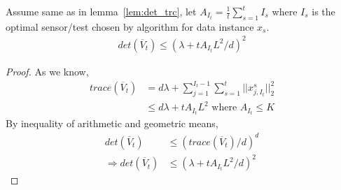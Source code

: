 \begin{lemma}
	\label{lem:tight_det_trc}
	Assume same as in lemma~\ref{lem:det_trc},  let $A_{I_t} = \frac{1}{t}\sum_{s=1}^{t}I_s$ where $I_s$ is the optimal sensor/test chosen by algorithm for data instance $x_s$. 
	\begin{align*}
	det(\overline{V}_t) \le (\lambda + tA_{I_t}L^2/d)^2
	\end{align*}
	
	\begin{proof}
		As we know, 
		\begin{align*}
		trace(\overline{V}_t) &= d\lambda +\sum_{j=1}^{I_t-1}\sum_{s=1}^{t}||x_{j, I_t}^s||_2^2  \\
		&\le d\lambda + tA_{I_t}L^2 \text{ where $A_{I_t} \le K$}
		\end{align*}
		By inequality of arithmetic and geometric means,
		\begin{align*}
		det(\overline{V}_t) &\le (trace(\overline{V}_t)/d)^d  \\
		\Rightarrow det(\overline{V}_t) &\le (\lambda + tA_{I_t}L^2/d)^2
		\end{align*}
	\end{proof}
\end{lemma}



